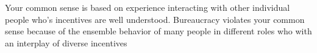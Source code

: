 Your common sense is based on experience interacting with other individual people who's incentives are well understood. Bureaucracy violates your common sense because of the ensemble behavior of  many people in different roles who with an interplay of diverse incentives
